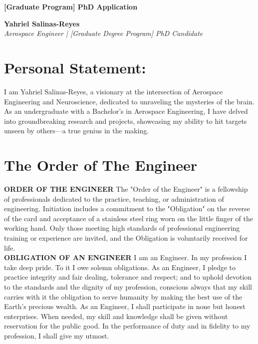 \documentclass[letterpaper,10pt]{article}
\begin{document}
\begin{center}
    \textbf{\LARGE [Graduate Program] PhD Application}
\end{center}

\pagestyle{empty}

\begin{center}
    \textbf{\LARGE Yahriel Salinas-Reyes} \\
    \textit{Aerospace Engineer | [Graduate Degree Program] PhD Candidate}
\end{center}


\section*{Personal Statement:}
I am Yahriel Salinas-Reyes, a visionary at the intersection of Aerospace Engineering and Neuroscience, dedicated to unraveling the mysteries of the brain. As an undergraduate with a Bachelor's in Aerospace Engineering, I have delved into groundbreaking research and projects, showcasing my ability to hit targets unseen by others—a true genius in the making.

\section*{The Order of The Engineer}
\textbf{ORDER OF THE ENGINEER}
The "Order of the Engineer" is a fellowship of professionals dedicated to the practice, teaching, or administration of engineering. Initiation includes a commitment to the "Obligation" on the reverse of the card and acceptance of a stainless steel ring worn on the little finger of the working hand. Only those meeting high standards of professional engineering training or experience are invited, and the Obligation is voluntarily received for life. \\

\textbf{OBLIGATION OF AN ENGINEER}
I am an Engineer. In my profession I take deep pride. To it I owe solemn obligations.
As an Engineer, I pledge to practice integrity and fair dealing, tolerance and respect; and to uphold devotion to the standards and the dignity of my profession, conscious always that my skill carries with it the obligation to serve humanity by making the best use of the Earth's precious wealth.
As an Engineer, I shall participate in none but honest enterprises. When needed, my skill and knowledge shall be given without reservation for the public good. In the performance of duty and in fidelity to my profession, I shall give my utmost. \\
\end{document}

